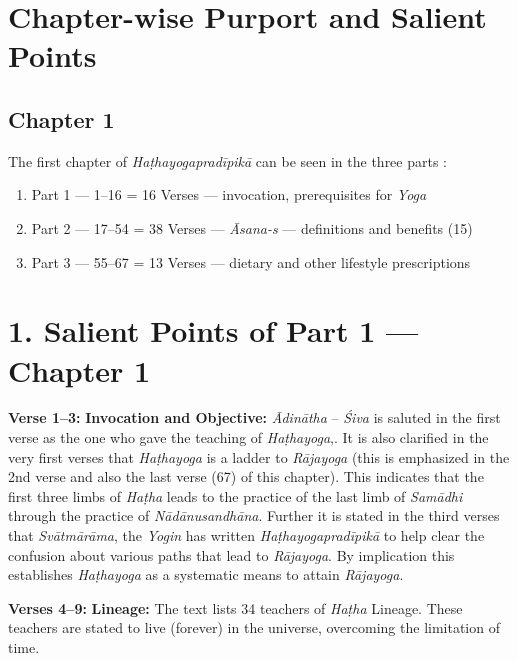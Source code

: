 \section*{Chapter-wise Purport and Salient Points}

\subsection*{Chapter 1}

The first chapter of \textit{Haṭhayogapradīpikā} can be seen in the three parts :

\begin{enumerate}
\itemsep=0pt
\renewcommand{\theenumi}{\arabic{enumi}}
\renewcommand{\labelenumi}{\theenumi)}
\item Part 1 --- 1--16      =  16 Verses --- invocation, prerequisites for \textit{Yoga} 
\item Part 2 --- 17--54    =  38 Verses --- \textit{Āsana-s} --- definitions and benefits (15)
\item Part 3 --- 55--67    =  13 Verses --- dietary and other lifestyle prescriptions
\end{enumerate}

\section*{1. Salient Points of Part 1 --- Chapter 1}

\textbf{Verse 1--3:}  \textbf{Invocation and Objective:} \textit{Ādinātha} –  \textit{Śiva} is saluted in the first verse as the one who gave the teaching of \textit{Haṭhayoga},. It is also clarified in the very first verses that \textit{Haṭhayoga}  is a ladder to \textit{Rājayoga} (this is emphasized in the 2nd verse and also the last verse (67)  of this chapter). This indicates that the first three limbs of \textit{Haṭha} leads to the practice of the last limb of \textit{Samādhi} through the practice of \textit{\textit{Nādānusandhāna}}. Further it is stated in the third verses that \textit{Svātmārāma}, the \textit{Yogin} has written \textit{Haṭhayogapradīpikā} to help clear the confusion about various paths that lead to \textit{Rājayoga}. By implication this establishes \textit{Haṭhayoga}  as a systematic means to attain \textit{Rājayoga}.

\textbf{Verses  4--9:} \textbf{Lineage:} The text lists 34 teachers of \textit{Haṭha} Lineage. These teachers are stated to live (forever) in the universe, overcoming the limitation of time.

